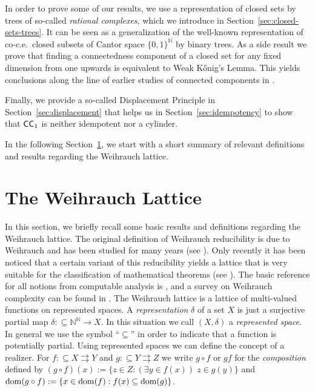 \documentclass[a4paper]{amsart}
\def\IN{{\mathbb{N}}}
\def\In{\subseteq}
\def\mto{\rightrightarrows}
\def\dom{{\rm dom}}
\def\ConC{\mbox{\rm\sffamily CC}}
\theoremstyle{definition}
\begin{document}
In order to prove some of our results, we use a representation of closed sets by 
trees of so-called {\em rational complexes}, which we introduce
in Section~\ref{sec:closed-sets-trees}.
It can be seen as a generalization of the well-known representation of
co-c.e.\ closed subsets of Cantor space $\{0,1\}^\IN$ by binary trees.
As a side result we prove that finding a connectedness component
of a closed set  for any fixed dimension from one upwards is 
equivalent to Weak K\H{o}nig's Lemma.
This yields conclusions along the line of earlier studies of 
connected components in \cite{LZ08a}.

Finally, we provide a so-called Displacement Principle in Section~\ref{sec:displacement}
that helps us in Section~\ref{sec:idempotency} to show  that $\ConC_1$ is neither idempotent
nor a cylinder.

In the following Section~\ref{sec:Weihrauch-lattice}, we start
with a short summary of relevant definitions and results regarding the
Weihrauch lattice.


\section{The Weihrauch Lattice}
\label{sec:Weihrauch-lattice}

In this section, we briefly recall some basic results and definitions regarding
the Weihrauch lattice. The original definition of Weihrauch reducibility is due to Weihrauch
and has been studied for many years (see \cite{Ste89,Wei92a,Wei92c,Her96,Bra99,Bra05}).
Only recently it has been noticed that a certain variant of this reducibility yields
a lattice that is very suitable for the classification of mathematical theorems
(see  \cite{GM09,Pau09,Pau10,BG11,BG11a,BBP12,BGM12}). The basic reference for all notions
from computable analysis is \cite{Wei00}, and a survey on Weihrauch complexity can be found in \cite{BGP17}. 
The Weihrauch lattice is a lattice of multi-valued functions on represented
spaces. A {\em representation} $\delta$ of a set $X$ is just a surjective partial
map $\delta:\In\IN^\IN\to X$. In this situation we call $(X,\delta)$ a {\em represented space}.
In general we use the symbol ``$\In$'' in order to indicate that a function is potentially partial.
Using represented spaces we can define the concept of a realizer. 
For $f:\In X\mto Y$ and $g:\In Y\mto Z$ we write $g\circ f$ or $gf$ for the {\em composition}
defined by $(g\circ f)(x):=\{z\in Z:(\exists y\in f(x))\;z\in g(y)\}$ and $\dom(g\circ f):=\{x\in \dom(f):f(x)\In\dom(g)\}$.
\end{document}
